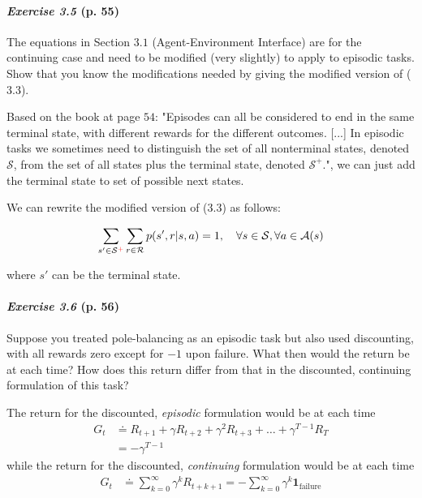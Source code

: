 \documentclass[10pt,a4paper]{article}
\begin{document}
\paragraph{\textit{Exercise 3.5} (p. 55)} The equations in Section $3.1$ (Agent-Environment Interface) are for the continuing case and need to be modified (very slightly) to apply to episodic tasks. Show that you know the modifications needed by giving the modified version of ($3.3$).

\bigskip
Based on the book at page $54$: "Episodes can all be considered to
end in the same terminal state, with different rewards for the different outcomes. [...] In episodic tasks we sometimes need
to distinguish the set of all nonterminal states, denoted $\mathcal{S}$, from the set of all states plus the terminal state, denoted $\mathcal{S}^+$.", we can just add the terminal state to set of possible next states.

We can rewrite the modified version of ($3.3$) as follows:

\begin{equation}
\sum_{s' \in \mathcal{S}^{\color{red}+\color{black}}} \sum_{r \in \mathcal{R}} p(s', r | s, a) = 1,\quad \forall s \in \mathcal{S}, \forall a \in \mathcal{A}(s)
\end{equation}

where $s'$ can be the terminal state.



\paragraph{\textit{Exercise 3.6} (p. 56)} Suppose you treated pole-balancing as an episodic task but also used discounting, with all rewards zero except for $-1$ upon failure. What then would the return be at each time? How does this return differ from that in the discounted, continuing formulation of this task?

\bigskip
The return for the discounted, \textit{episodic} formulation would be at each time
\begin{equation}
\begin{split}
G_t &\doteq R_{t+1} + \gamma R_{t+2} + \gamma^2 R_{t+3} + \hdots + \gamma^{T-1} R_T\\
&= -\gamma^{T-1}
\end{split}
\end{equation}
while the return for the discounted, \textit{continuing} formulation would be at each time
\begin{equation}
\begin{split}
G_t &\doteq \sum_{k=0}^\infty \gamma^k R_{t+k+1} = - \sum_{k=0}^\infty \gamma^k \textbf{1}_{\textrm{failure}}
\end{split}
\end{equation}
\end{document}
